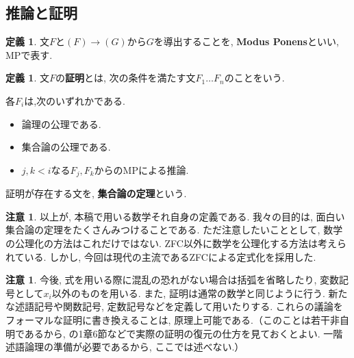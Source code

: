 \documentclass[a4paper, twoside]{bxjsarticle}
\theoremstyle{definition}
\newtheorem{defn}[thm]{定義}
\newtheorem{rem}[thm]{注意}
\begin{document}
    \subsection{推論と証明}
        \begin{defn}
            文$F$と$(F) \to (G)$から$G$を導出することを, \textbf{Modus Ponens}といい, MPで表す. 
        \end{defn}
        \begin{defn}
            文$F$の\textbf{証明}とは, 次の条件を満たす文$F_1 \dots F_n$のことをいう.
            
            各$F_i$は,次のいずれかである.
            \begin{itemize}
                \item 論理の公理である.
                \item 集合論の公理である.
                \item $j, k < i$なる$F_j, F_k$からのMPによる推論.
             \end{itemize}
            証明が存在する文を, \textbf{集合論の定理}という.
        \end{defn}
        
        \begin{rem}
            以上が, 本稿で用いる数学それ自身の定義である. 我々の目的は, 面白い集合論の定理をたくさんみつけることである. ただ注意したいこととして, 数学の公理化の方法はこれだけではない. ZFC以外に数学を公理化する方法は考えられている. しかし, 今回は現代の主流であるZFCによる定式化を採用した. 
        \end{rem}
        \begin{rem}
            今後, 式を用いる際に混乱の恐れがない場合は括弧を省略したり, 変数記号として$x_i$以外のものを用いる. また, 証明は通常の数学と同じように行う. 新たな述語記号や関数記号, 定数記号などを定義して用いたりする.
            これらの議論をフォーマルな証明に書き換えることは, 原理上可能である.（このことは若干非自明であるから, \cite{arai}の1章6節などで実際の証明の復元の仕方を見ておくとよい. 一階述語論理の準備が必要であるから, ここでは述べない.） 
        \end{rem}
        
\end{document}
